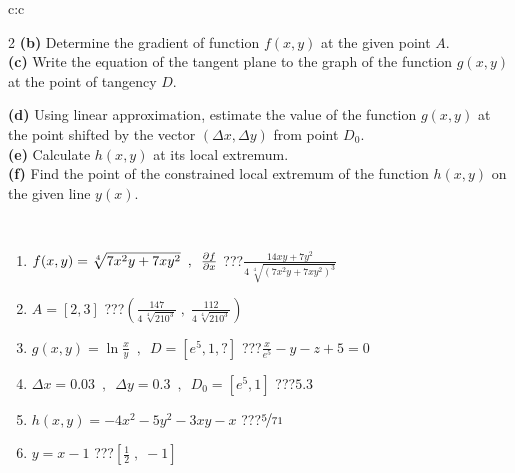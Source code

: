 \documentclass[10pt]{report}
\begin{document}
\begin{tabular}{c:c}
\begin{minipage}[c][104.5mm][t]{0.5\linewidth}
\begin{center}
\begin{minipage}{0.95\linewidth}
\begin{center}
{\begin{multicols}{2}
\textbf{(b)} Determine the gradient of function \(f(x,y)\) at the given point \(A\). \\[1mm]
\textbf{(c)} Write the equation of the tangent plane to the graph of the function \(g(x,y)\) at the point of tangency \(D\). \par \columnbreak
\textbf{(d)} Using linear approximation, estimate the value of the function \(g(x,y)\) at the point shifted by the vector \((\Delta x, \Delta y)\) from point \(D_0\). \\[1mm]
\textbf{(e)} Calculate \(h(x,y)\) at its local extremum. \\[1mm]
\textbf{(f)} Find the point of the constrained local extremum of the function \(h(x,y)\) on the given line \(y(x)\). \\[1mm]
\end{multicols}
}
\end{center}
\end{minipage}
\\[4mm]
\begin{minipage}{0.79\linewidth}
\begin{center}
\begin{varwidth}{\linewidth}
\begin{enumerate}
\normalsizerr
\item $f(x,y) = \sqrt[4]{7x^2y + 7xy^2}\enspace , \enspace \pdv{f}{x}$\quad \dotfill\; ???\;\dotfill \quad $\frac{14xy+7y^2}{4\,\sqrt[4]{(7x^2y+7xy^2)^{3}}}$
\item $A = [2, 3]$\quad \dotfill\; ???\;\dotfill \quad $\left( \frac{147}{4\,\sqrt[4]{210^3}} \;,\; \frac{112}{4\,\sqrt[4]{210^3}} \right)$
\item $g(x,y) = \ln\frac{x}{y} \enspace , \enspace D=[e^{5},1,?]$\quad \dotfill\; ???\;\dotfill \quad $\frac{x}{e^5} - y - z + 5 = 0$
\item $\Delta x = {0.03} \enspace,\enspace \Delta y = {0.3} \enspace,\enspace D_0 = [e^{5},1]$\quad \dotfill\; ???\;\dotfill \quad $5.3$
\item $h(x,y) = -4x^2-5y^2-3xy-x$\quad \dotfill\; ???\;\dotfill \quad $\nicefrac{5}{71}$
\item $y = x-1$\quad \dotfill\; ???\;\dotfill \quad $\left[\frac{1}{2}\;,\;-1\right]$
\end{enumerate}
\end{varwidth}
\end{center}
\end{minipage}
\begin{minipage}{0.20\linewidth}
\begin{center}

\end{center}
\end{minipage}
\end{center}
\end{minipage}
\end{tabular}
\end{document}
